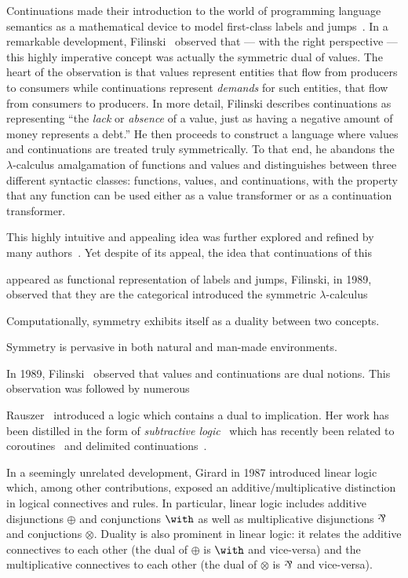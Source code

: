 \documentclass[preprint]{sigplanconf}
\begin{document}
Continuations made their introduction to the world of programming language
semantics as a mathematical device to model first-class labels and
jumps~\cite{springerlink:10.1023/A:1010026413531}. In a remarkable
development, Filinski~\cite{Filinski:1989:DCI:648332.755574} observed that
--- with the right perspective --- this highly imperative concept was
actually the symmetric dual of values. The heart of the observation is that
values represent entities that flow from producers to consumers while
continuations represent \emph{demands} for such entities, that flow from
consumers to producers. In more detail, Filinski describes continuations as
representing ``the \emph{lack} or \emph{absence} of a value, just as having a
negative amount of money represents a debt.'' He then proceeds to construct a
language where values and continuations are treated truly symmetrically. To
that end, he abandons the $\lambda$-calculus amalgamation of functions and
values and distinguishes between three different syntactic classes:
functions, values, and continuations, with the property that any function can
be used either as a value transformer or as a continuation transformer.

This highly intuitive and appealing idea was further explored and refined by
many authors~\cite{Griffin:1989:FNC:96709.96714, curien00duality,
  Wadler:2003, DBLP:conf/rta/Wadler05}. Yet despite of its appeal, the idea
that continuations of this






appeared as functional
representation of labels and jumps,
Filinski, in 1989, observed that they
are the categorical introduced the symmetric $\lambda$-calculus

Computationally, symmetry exhibits itself as a duality between
two concepts. 

Symmetry is pervasive in both natural and man-made environments. 


In 1989, Filinski~\cite{Filinski:1989:DCI:648332.755574} observed that values
and continuations are dual notions. This observation was followed by numerous

Rauszer~\cite{springerlink:10.1007/BF02120864,rauszer,rauszer2} introduced a
logic which contains a dual to implication. Her work has been distilled in
the form of \emph{subtractive logic}~\cite{Crolard01} which has recently been
related to coroutines~\cite{Crolard01082004} and delimited
continuations~\cite{Ariola:2009:TFD:1743339.1743381}.

In a seemingly unrelated development, Girard in 1987 introduced linear
logic~\cite{Girard87tcs} which, among other contributions, exposed an
additive/multiplicative distinction in logical connectives and rules. In
particular, linear logic includes additive disjunctions $\oplus$ and
conjunctions $\with$ as well as multiplicative disjunctions $\parr$ and
conjuctions $\otimes$. Duality is also prominent in linear logic: it relates
the additive connectives to each other (the dual of $\oplus$ is $\with$ and
vice-versa) and the multiplicative connectives to each other (the dual of
$\otimes$ is $\parr$ and vice-versa).
\end{document}
